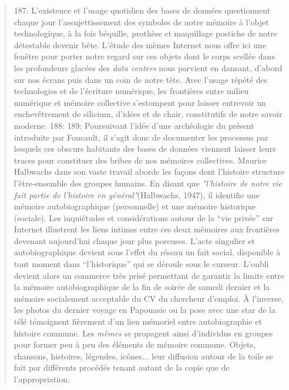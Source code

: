 \begin{quote}
187: L{\textquoteright}existence et l{\textquoteright}usage quotidien des bases de donn\'ees questionnent chaque jour l{\textquoteright}assujettissement des symboles de notre m\'emoire \`a l{\textquoteright}objet technologique, \`a la fois b\'equille, proth\`ese et maquillage postiche de notre d\'etestable devenir b\^ete. L{\textquoteright}\'etude des m\`emes Internet nous offre ici une fen\^etre pour porter notre regard sur ces objets dont le corps scell\'ee dans les profondeurs glac\'ees des \textit{data centers }nous parvient en dansant, d{\textquoteright}abord sur nos \'ecrans puis dans un coin de notre t\^ete. Avec l{\textquoteright}usage r\'ep\'et\'e des technologies et de l{\textquoteright}\'ecriture num\'erique, les fronti\`eres entre milieu num\'erique et m\'emoire collective s{\textquoteright}estompent pour laisser entrevoir un enchev\^etrement de silicium, d{\textquoteright}id\'ees et de chair, constitutifs de notre savoir moderne. 
188: 
189: Poursuivant l{\textquoteright}id\'ee d{\textquoteright}une arch\'eologie du pr\'esent introduite par Foucault, il s{\textquoteright}agit donc de documenter les processus par lesquels ces obscurs habitants des bases de donn\'ees viennent laisser leurs traces pour constituer des bribes de nos m\'emoires collectives. Maurice Halbwachs dans son vaste travail aborde les fa\c{c}ons dont l{\textquoteright}histoire structure l{\textquoteright}\^etre-ensemble des groupes humains. En disant que \textit{"l'histoire de notre vie fait partie de l'histoire en général"}(Halbwachs, 1947), il identifie une m\'emoire autobiographique (personnelle) et une m\'emoire historique (sociale). Les inqui\'etudes et consid\'erations autour de la {\textquotedblleft}vie priv\'ee{\textquotedblright} sur Internet illustrent les liens intimes entre ces deux m\'emoires aux fronti\`eres devenant aujourd{\textquoteright}hui chaque jour plus poreuses. L{\textquoteright}acte singulier et autobiographique devient sous l{\textquoteright}effet du r\'eseau un fait social, disponible \`a tout moment dans {\textquotedblleft}l{\textquoteright}historique{\textquotedblright} qui se d\'eroule sous le curseur. L{\textquoteright}oubli devient alors un commerce tr\`es pris\'e permettant de garantir la limite entre la m\'emoire autobiographique de la fin de soir\'ee de samedi dernier et la m\'emoire socialement acceptable du CV du chercheur d{\textquoteright}emploi. \`A l{\textquoteright}inverse, les photos du dernier voyage en Papouasie ou la pose avec une star de la t\'el\'e t\'emoignent fi\`erement d{\textquoteright}un lien m\'emoriel entre autobiographie et histoire commune. Les \textit{m\`emes} se propagent ainsi d{\textquoteright}individus en groupes pour former peu \`a peu des \'el\'ements de m\'emoire commune. Objets, chansons, histoires, l\'egendes, ic\^ones... leur diffusion autour de la toile se fait par diff\'erents proc\'ed\'es tenant autant de la copie que de l{\textquoteright}appropriation. 

\end{quote}
